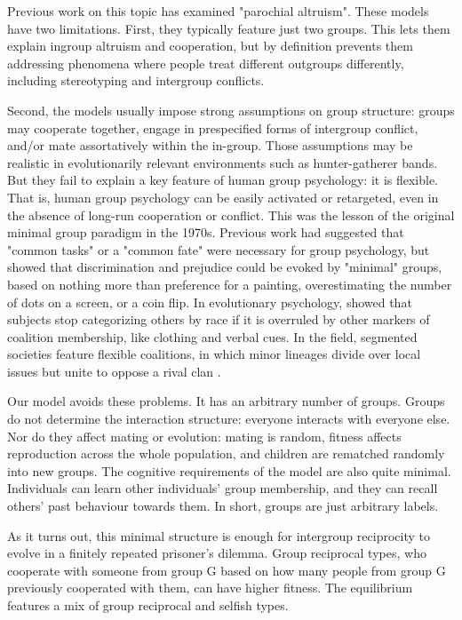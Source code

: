 \documentclass[12pt,a4paper]{article}
\begin{document}
Previous work on this topic has examined "parochial altruism". These models have 
two limitations. First, they typically
feature just two groups. This lets them explain ingroup altruism and cooperation,
but by definition prevents them addressing phenomena where people treat 
different outgroups differently, including stereotyping and intergroup conflicts.

Second, the models usually impose strong assumptions on group structure: groups
may cooperate together, engage in prespecified forms of intergroup conflict, and/or 
mate assortatively within the in-group. Those assumptions may be realistic
in evolutionarily relevant environments such as hunter-gatherer bands. 
But they fail to explain a key feature of human group psychology: it is flexible. 
That is, human group psychology can
be easily activated or retargeted, even in the absence of long-run cooperation
or conflict. This was the lesson of the original minimal group paradigm in the 
1970s. Previous work had suggested that "common tasks" or a "common fate" were
necessary for group psychology, but \cite{tajfel1971social} 
showed that discrimination and prejudice could be evoked by "minimal" groups, 
based on nothing more than preference for a painting, overestimating the number 
of dots on a screen, or a coin flip. In evolutionary psychology, 
\cite{kurzban2001can} showed that subjects stop categorizing others by race if
it is overruled by other markers of coalition membership, like clothing and 
verbal cues. In the field, segmented societies feature flexible coalitions,
in which minor lineages divide over local issues but unite to oppose a 
rival clan \parencite{fortes2015african}.

Our model avoids these problems. It has an arbitrary number of groups. Groups
do not determine the interaction structure: everyone interacts with
everyone else. Nor do they affect mating or evolution: mating is random,
fitness affects reproduction across the whole population, and children are
rematched randomly into new groups. The cognitive requirements of the model
are also quite minimal. Individuals can learn other individuals' group membership, 
and they can recall others' past behaviour towards them. In short, groups are 
just arbitrary labels.

As it turns out, this minimal structure is enough for intergroup reciprocity to evolve
in a finitely repeated prisoner's dilemma. Group reciprocal types, who cooperate
with someone from group G based on how many people from group G previously cooperated
with them, can have higher fitness. The equilibrium features a mix of group reciprocal
and selfish types.
\end{document}
